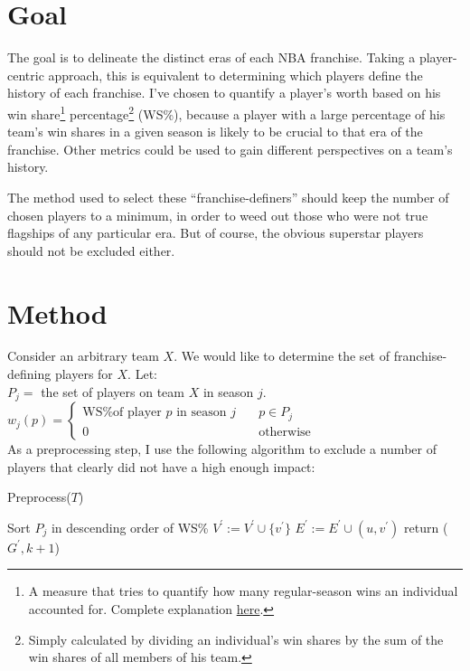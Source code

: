 \documentclass[a4paper,11pt]{article}
\begin{document}
\section{Goal}
The goal is to delineate the distinct eras of each NBA franchise. Taking a player-centric approach, this is equivalent to determining which players define the history of each franchise. I've chosen to quantify a player's worth based on his win share\footnote{A measure that tries to quantify how many regular-season wins an individual accounted for. Complete explanation \href{http://www.basketball-reference.com/about/ws.html}{here}.} percentage\footnote{Simply calculated by dividing an individual's win shares by the sum of the win shares of all members of his team.} (WS\%), because a player with a large percentage of his team's win shares in a given season is likely to be crucial to that era of the franchise. Other metrics could be used to gain different perspectives on a team's history.

The method used to select these ``franchise-definers'' should keep the number of chosen players to a minimum, in order to weed out those who were not true flagships of any particular era. But of course, the obvious superstar players should not be excluded either.

\section{Method}
Consider an arbitrary team $X$. We would like to determine the set of franchise-defining players for $X$. Let:\\

$P_j=$ the set of players on team $X$ in season $j$.\\ 


$w_j(p) = \left\{ \begin{array}{ll}
		            \text{WS\% of player } p \text{ in season } j & \quad p \in P_j\\
		            0 & \quad \text{otherwise}
		        \end{array}
 		   \right. $\\



As a preprocessing step, I use the following algorithm to exclude a number of players that clearly did not have a high enough impact:\\

	\begin{algorithm} [H]
	\caption{Preprocess($T$)}
	 {
		Sort $P_j$ in descending order of WS\%\;
	$V^\prime := V^\prime \cup \{v^\prime\}$\;
       	 {
	$E^\prime := E^\prime \cup (u,v^\prime)$\;
	}
	}
	return ($G^\prime,k+1$)\;
	\end{algorithm}
\end{document}
